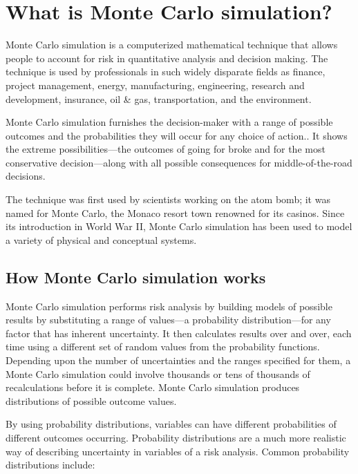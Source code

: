 \section*{What is Monte Carlo simulation?}
Monte Carlo simulation is a computerized mathematical technique that allows people to account for risk in quantitative analysis and decision making. The technique is used by professionals in such widely disparate fields as finance, project management, energy, manufacturing, engineering, research and development, insurance, oil & gas, transportation, and the environment.

Monte Carlo simulation furnishes the decision-maker with a range of possible outcomes and the probabilities they will occur for any choice of action.. It shows the extreme possibilities—the outcomes of going for broke and for the most conservative decision—along with all possible consequences for middle-of-the-road decisions.

The technique was first used by scientists working on the atom bomb; it was named for Monte Carlo, the Monaco resort town renowned for its casinos. Since its introduction in World War II, Monte Carlo simulation has been used to model a variety of physical and conceptual systems.
\subsection*{How Monte Carlo simulation works}
Monte Carlo simulation performs risk analysis by building models of possible results by substituting a range of values—a probability distribution—for any factor that has inherent uncertainty. It then calculates results over and over, each time using a different set of random values from the probability functions. Depending upon the number of uncertainties and the ranges specified for them, a Monte Carlo simulation could involve thousands or tens of thousands of recalculations before it is complete. Monte Carlo simulation produces distributions of possible outcome values.

By using probability distributions, variables can have different probabilities of different outcomes occurring.  Probability distributions are a much more realistic way of describing uncertainty in variables of a risk analysis.  Common probability distributions include:

